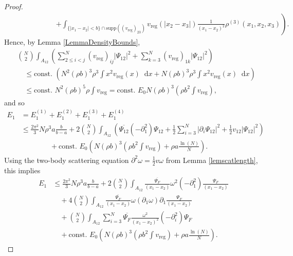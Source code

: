 \documentclass[a4paper,11pt]{article}
\newcommand{\supp}{\text{supp}}
\newcommand{\abs}[1]{\left\lvert #1 \right\rvert}
\newcommand*\diff{\mathop{}\!\mathrm{d}}
\numberwithin{equation}{section}
\begin{document}
\begin{proof}
\begin{equation}
\begin{aligned}
		&\qquad\qquad\qquad\left.+\int_{\{\abs{x_1-x_2}<b\}\cap\supp((v_{\text{reg}})_{23})}v_{\text{reg}}(\abs{x_2-x_3})\frac{1}{(x_1-x_2)^2}\rho^{(3)}(x_1,x_2,x_3)\right).
		\end{aligned}
		\end{equation}
		Hence, by Lemma \ref{LemmaDensityBounds}, 
		\begin{equation}
		\begin{aligned}
		&\binom{N}{2}\int_{A_{12}} \left(\sum_{2\leq i<j}^{N}(v_{\text{reg}})_{ij}\abs{\Psi_{12}}^2+\sum_{k=3}^{N}(v_{\text{reg}})_{1k}\abs{\Psi_{12}}^2\right)\\&\quad\leq \text{const. } \left(N^2(\rho b)^3\rho^3\int x^2 v_{\text{reg}}(x)\diff x+N(\rho b)^3 \rho^3 \int x^2 v_{\text{reg}}(x)\diff x\right)\\
		&\quad \leq \text{const. } N^2(\rho b)^5\rho \int v_{\text{reg}}=\text{const. }E_0 N (\rho b)^3 \left(\rho b^2\int v_{\text{reg}}\right),
		\end{aligned}
		\end{equation}
		and so \begin{equation}
		\begin{aligned}
		E_1&=E_1^{(1)}+E_1^{(2)}+E_1^{(3)}+E_1^{(4)}\\&\leq \frac{2\pi^2}{3}N\rho^3 a\frac{b}{b-a}+2\binom{N}{2}\int_{A_{12}}\left(\overline{\Psi_{12}}(-\partial^2_1)\Psi_{12}+\frac{1}{2}\sum_{i=3}^{N}\abs{\partial_i\Psi_{12}}^2+\frac{1}{2}v_{12}\abs{\Psi_{12}}^2\right)\\&\qquad \qquad +\text{const. } E_0\left(N(\rho b)^3\left(\rho b^2 \int v_{\text{reg}}\right)+\rho a\frac{\ln(N)}{N}\right).
		\end{aligned}
		\end{equation}
		Using the two-body scattering equation $ \partial^2\omega=\frac{1}{2}v\omega$ from Lemma \ref{lemscatlength}, this implies \begin{equation}
        \label{someest}
		\begin{aligned}
		E_1&\leq \frac{2\pi^2}{3}N\rho^3 a\frac{b}{b-a}+2\binom{N}{2}\int_{A_{12}}\frac{\overline{\Psi_F}}{(x_1-x_2)}\omega^2(-\partial^2_1)\frac{\Psi_F}{(x_1-x_2)}\\&\quad+4\binom{N}{2}\int_{A_{12}}\frac{\overline{\Psi_F}}{(x_1-x_2)}\omega(\partial_1\omega)\partial_1\frac{\Psi_F}{(x_1-x_2)}\\
		&\quad +\binom{N}{2}\int_{A_{12}}\sum_{i=3}^{N} \overline{\Psi_F}\frac{\omega^2}{(x_1-x_2)^2}(-\partial^2_i)\Psi_F
		\\&\quad+\text{const. } E_0\left(N(\rho b)^3\left(\rho b^2 \int v_{\text{reg}}\right)+\rho a\frac{\ln(N)}{N}\right).

\end{aligned}
\end{equation}
\end{proof}
\end{document}
